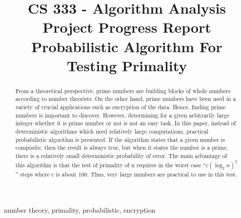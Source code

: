 \documentclass[conference]{IEEEtran}
\begin{document}
\title{ \large{CS 333 - Algorithm Analysis} \\ 
        \Huge{Project Progress Report}\\
        {\large Probabilistic Algorithm For Testing Primality }
}

\author{
\and
{}
\and
{}
}

\maketitle

\begin{abstract}
From a theoretical perspective, prime numbers are building blocks of whole numbers according to number theorists. On the other hand, prime numbers have been used in a variety of crucial applications such as encryption of the data. Hence, finding prime numbers is important to discover. However, determining for a given arbitrarily large integer whether it is prime number or not is not an easy task. In this paper, instead of deterministic algorithms which need relatively large computations, practical probabilistic algorithm is presented. If the algorithm states that a given number is composite, then the result is always true, but when it states the number is a prime, there is a relatively small deterministic probability of error. The main advantage of this algorithm is that the test of primality of n requires in the worst case “$c(\log_2 n)^2$” steps where c is about 100. Thus, very large numbers are practical to use in this test.
\end{abstract}

\begin{IEEEkeywords}
number theory, primality, probabilistic, encryption
\end{IEEEkeywords}
\end{document}
